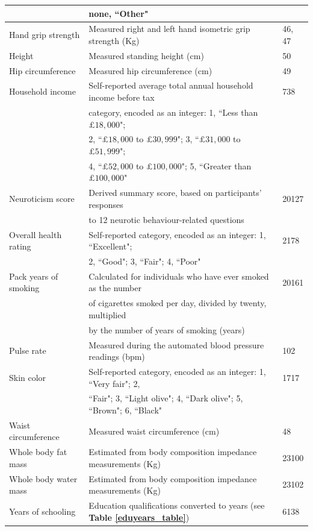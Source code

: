 \documentclass[hidelinks, 12pt]{article}
\begin{document}
\begin{table}[h]
\begin{center}
{\begin{tabular}{| l l l |}
  &none, ``Other"&\\
  \hline
  Hand grip strength & Measured right and left hand isometric grip strength (Kg) & 46, 47  \\ 
  \hline
  Height & Measured standing height (cm) & 50  \\ 
  \hline
  Hip circumference & Measured hip circumference (cm) & 49  \\ 
  \hline
  Household income & Self-reported average total annual household income before tax& 738\\
  &category, encoded as an integer: 1, ``Less than $\pounds18,000$";&\\
  &2, ``$\pounds18,000$ to $\pounds30,999$"; 3, ``$\pounds31,000$ to $\pounds51,999$";&\\
  &4, ``$\pounds52,000$ to $\pounds100,000$"; 5, ``Greater than $\pounds100,000$"&  \\ 
  \hline
  Neuroticism score & Derived summary score, based on participants' responses & 20127\\
  &to 12 neurotic behaviour-related questions & \\ 
  \hline
  Overall health rating & Self-reported category, encoded as an integer: 1, ``Excellent";& 2178\\
  &2, ``Good"; 3, ``Fair"; 4, ``Poor" &  \\ 
  \hline
  Pack years of smoking & Calculated for individuals who have ever smoked as the number& 20161\\
  &of cigarettes smoked per day, divided by twenty, multiplied&\\
  &by the number of years of smoking (years)&\\ 
  \hline
  Pulse rate & Measured during the automated blood pressure readings (bpm) & 102  \\ 
  \hline
  Skin color & Self-reported category, encoded as an integer: 1, ``Very fair"; 2, & 1717\\
  &``Fair"; 3, ``Light olive"; 4, ``Dark olive"; 5, ``Brown"; 6, ``Black" & \\
  \hline
  Waist circumference & Measured waist circumference (cm) & 48  \\ 
  \hline
  Whole body fat mass & Estimated from body composition impedance measurements (Kg) & 23100  \\ 
  \hline
  Whole body water mass & Estimated from body composition impedance measurements (Kg) & 23102  \\ 
  \hline
  Years of schooling & Education qualifications converted to years (see \textbf{Table \ref{eduyears_table}}) & 6138 \\ 
   \hline
 \end{tabular}}
\end{center}
\end{table}
\end{document}
